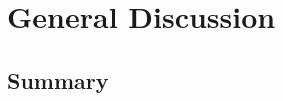 \documentclass[11pt]{article}
\newcommand{\jd}[1]{\textcolor{Red}{[jd: #1]}}
\begin{document}
%
%
%




\section{General Discussion}
\label{sec:gd}








\subsection{Summary}
\end{document}
